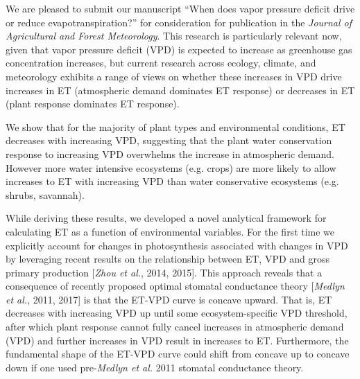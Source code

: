 \documentclass[10pt,stdletter,dateno]{newlfm}
\begin{document}
\begin{newlfm}

  We are pleased to submit our manuscript ``When does vapor pressure deficit drive or reduce evapotranspiration?'' for consideration for publication in the \textit{Journal of Agricultural and Forest Meteorology}. This research is particularly relevant now, given that vapor pressure deficit (VPD) is expected to increase as greenhouse gas concentration increases, but current research across ecology, climate, and meteorology exhibits a range of views on whether these increases in VPD drive increases in ET (atmospheric demand dominates ET response) or decreases in ET (plant response dominates ET response).

  We show that for the majority of plant types and environmental conditions, ET decreases with increasing VPD, suggesting that the plant water conservation response to increasing VPD overwhelms the increase in atmospheric demand. However more water intensive ecosystems (e.g. crops) are more likely to allow increases to ET with increasing VPD than water conservative ecosystems (e.g. shrubs, savannah).

  While deriving these results, we developed a novel analytical framework for calculating ET as a function of environmental variables. For the first time we explicitly account for changes in photosynthesis associated with changes in VPD by leveraging recent results on the relationship between ET, VPD and gross primary production [\textit{Zhou et al.}, 2014, 2015]. This approach reveals that a consequence of recently proposed optimal stomatal conductance theory [\textit{Medlyn et al.}, 2011, 2017] is that the ET-VPD curve is concave upward. That is, ET decreases with increasing VPD up until some ecosystem-specific VPD threshold, after which plant response cannot fully cancel increases in atmospheric demand (VPD) and further increases in VPD result in increases to ET. Furthermore, the fundamental shape of the ET-VPD curve could shift from concave up to concave down if one used pre-\textit{Medlyn et al.} 2011 stomatal conductance theory.


\end{newlfm}
\end{document}
